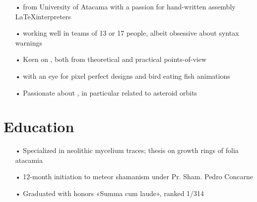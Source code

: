 \documentclass{cv}
\begin{document}
	\maketitle

	\begin{header}
		\begin{itemize}
			\item[•]  from University of Atacama with a passion for hand-written assembly \LaTeX interpreters
			\item[•]  working well in teams of 13 or 17 people, albeit obsessive about syntax warnings
			\item[•] Keen on , both from theoretical and practical points-of-view
			\item[•]  with an eye for pixel perfect designs and bird eating fish animations
			\item[•] Passionate about , in particular related to asteroid orbits
		\end{itemize}
	\end{header}
	
	\section{Education}
		\begin{position}[title={Master's degrpee in petroglyph digitization},
		                 institution={University of Eastern Atacama},
		                 country=Chili,
		                 from=2006,
		                 to=2008]
		      \vspace{-\baselineskip} %
			\begin{itemize}
				\item[•] Specialized in neolithic mycelium traces; thesis on growth rings of folia atacamia
				\item[•] 12-month initiation to meteor shamanism under Pr. Sham. Pedro {Concarne}
				\item[•] Graduated with honors «Summa cum laude», ranked { 1/314}
			\end{itemize}
		\end{position}

		\vspace{0.3\baselineskip} %
\end{document}
